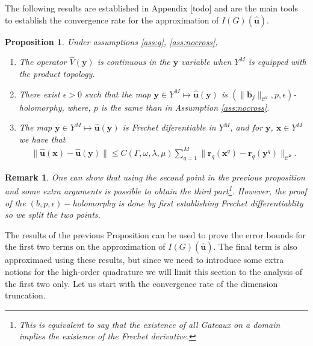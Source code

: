 \documentclass{article}
\newtheorem{proposition}[theorem]{Proposition}
\newtheorem{remark}[theorem]{Remark}
\newcommand{\todo}[1]{{\color{red}[#1]}}
\begin{document}
The following results are established in Appendix \todo{todo} and are the main tools to establish the convergence rate for the approximation of $I(G)(\widehat{\mathbf{u}})$.
\begin{proposition}
\label{prop:convgaux}
Under assumptions \ref{ass:g}, \ref{ass:nocross},
\begin{enumerate}
\item 
The operator $\widehat{V}(\mathbf{y})$ is continuous in the $\mathbf{y}$ variable when $Y^M$ is equipped with the product topology. 
\item
 There exist $\epsilon >0$ such that the map $\mathbf{y} \in Y^M \mapsto \widehat{\mathbf{u}}(\mathbf{y})$ is $(\|\mathbf{b}_j\|_{\mathbf{\mathcal{C}}^2}, p, \epsilon)$-holomorphy, where, $p$ is the same than in Assumption \ref{ass:nocross}.
\item 
The map  $\mathbf{y} \in Y^M \mapsto \widehat{\mathbf{u}}(\mathbf{y})$ is Frechet diferentiable in $Y^M$, and 
 for $\mathbf{y}$, $\mathbf{x} \in Y^M$ we have that 
\begin{align*}
\|\widehat{\mathbf{u}}(\mathbf{x}) - \widehat{\mathbf{u}}(\mathbf{y}) \| \leq C(\Gamma, \omega, \lambda, \mu) \sum_{q=1}^M \| \mathbf{r}_q(\mathbf{x}^q)-\mathbf{r}_q(\mathbf{y}^q) \|_{\mathbf{\mathcal{C}^2}}.
\end{align*}
\end{enumerate}
\end{proposition}
\begin{remark}
One can show that using the second point in the previous proposition and some extra arguments is possible to obtain the third part\footnote{This is equivalent to say that the existence of all Gateaux on a domain implies the existence of the Frechet derivative. }. However, the proof of the $(b,p,\epsilon)-$holomorphy is done by first establishing Frechet differentiablity so we split the two points. 
\end{remark}
The results of the previous Proposition can be used to prove the error bounds for the first two terms on the approximation of $I(G)(\widehat{\mathbf{u}})$. The final term is also approximaed using these results, but since we need to introduce some extra notions for the high-order quadrature we will limit this section to the analysis of the first two only. Let us start with the convergence rate of the dimension truncation. 
\end{document}
